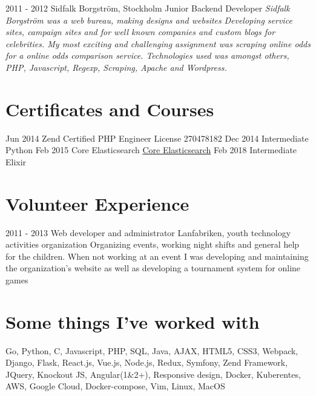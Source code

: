 \documentclass[]{friggeri-cv}
\begin{document}
\begin{entrylist}
  \bigentry
    {2011 - 2012}
    {Sidfalk Borgström, Stockholm}
    {Junior Backend Developer}
    {\textit{Sidfalk Borgström was a web bureau, making designs and websites}}
    {\emph{Developing service sites, campaign sites and for well known companies and custom blogs for celebrities. My most exciting and challenging assignment was scraping online odds for a online odds comparison service. Technologies used was amongst others, PHP, Javascript, Regexp, Scraping, Apache and Wordpress.}}
\end{entrylist}

\section{Certificates and Courses}
\begin{entrylist}
  \entry
    {Jun 2014}
    {Zend Certified PHP Engineer}
    {License 270478182}
    {}
  \entry
    {Dec 2014}
    {Intermediate Python}
    {}
    {}
  \entry
    {Feb 2015}
    {Core Elasticsearch}
    {\href{https://training.elastic.co/instructor-led-training/CoreESOperations}{Core Elasticsearch}}
    {}
  \entry
    {Feb 2018}
    {Intermediate Elixir}
    {}
    {}
\end{entrylist}

\section{Volunteer Experience}

\begin{entrylist}
  \entry
    {2011 - 2013}
    {Web developer and administrator}
    {Lanfabriken, youth technology activities organization}
    {Organizing events, working night shifts and general help for the children. When not working at an event I was developing and maintaining the organization's website as well as developing a tournament system for online games}
\end{entrylist}

\section{Some things I've worked with}
 Go, Python, C, Javascript, PHP, SQL, Java, AJAX, HTML5, CSS3, Webpack, Django, Flask, React.js, Vue.js, Node.js, Redux, Symfony, Zend Framework, JQuery, Knockout JS, Angular(1\&2+), Responsive design, Docker, Kuberentes, AWS, Google Cloud, Docker-compose, Vim, Linux, MacOS
\end{document}
